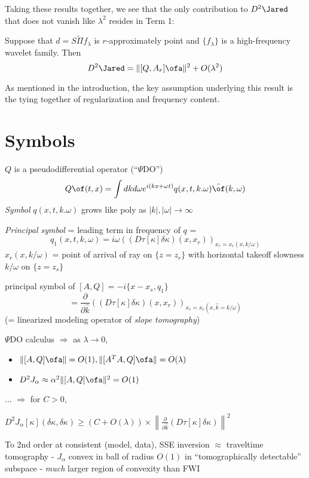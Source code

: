 Taking these results together, we see that the only contribution to $D^2\Jared$ that does not vanish like $\lambda^2$ resides in Term 1:

\begin{theorem}
\label{d2j}
Suppose that $d=S\tilde{\Pi}f_{\lambda}$ is $r$-approximately point and $\{f_{\lambda}\}$ is a high-frequency wavelet family. Then
\[
D^2\Jared = \|[Q,A_r]\ofa\|^2 + O(\lambda^2)
\]
\end{theorem}

\begin{remark}
As mentioned in the introduction, the key assumption underlying this result is the tying together of regularization and frequency content.
\end{remark}

\section{Symbols}

$Q$ is a pseudodifferential operator (``$\Psi$DO'') 
\[
Q\of(t,x) = \int dk d\omega e^{i(kx+\omega t)}q(x,t,k.\omega) \hat{\of}(k,\omega)
\]
{\em Symbol} $q(x,t,k.\omega)$ grows like poly as $|k|,|\omega| \rightarrow \infty$

{\em Principal symbol} = leading term in frequency of $q$ = 
\[
q_1(x,t,k,\omega) = i\omega \left((D\tau[\kappa]\delta \kappa)(x,x_r)\right)_{x_r=x_r(x,k/\omega)}
\]
$x_r(x,k/\omega)$ = point of arrival of ray on $\{z=z_r\}$ with horizontal takeoff slowness $k/\omega$ on $\{z=z_s\}$

principal symbol of $[A,Q]= -i\{x-x_s,q_1\} $
\[
=\frac{\partial}{\partial \hat{k}}\left((D\tau[\kappa]\delta \kappa)(x,x_r)\right)_{x_r=x_r(x,\hat{k}=k/\omega)}
\]
(= linearized modeling operator of {\em slope tomography})


$\Psi$DO calculus $\Rightarrow$ as $\lambda \rightarrow 0$,
\begin{itemize}
\item $\|[A,Q]\ofa\|=O(1), \|[A^TA,Q]\ofa\|=O(\lambda)$ 
\item $D^2J_{\alpha} \approx \alpha^2 \|[A,Q]\ofa\|^2 = O(1)$
\end{itemize}


... $\Rightarrow$  for $C>0$,

$D^2J_{\alpha}[\kappa](\delta \kappa,\delta \kappa) \ge (C+ O(\lambda)) \times \left\|\frac{\partial}{\partial \hat{k}}(D\tau[\kappa]\delta \kappa)\right\|^2 $

{\color{blue} To 2nd order at consistent (model, data), SSE inversion $\approx$ traveltime tomography - $J_{\alpha}$ convex in ball of radius $O(1)$ in ``tomographically detectable'' subspace - {\em much} larger region of convexity than FWI} 
